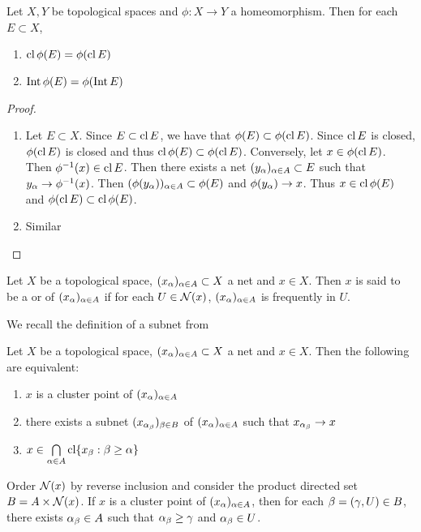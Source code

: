 \documentclass{book}
\begin{document}
	\begin{ex} 
		Let $X, Y$ be topological spaces and $\phi: X \rightarrow Y$ a homeomorphism. Then for each $E \subset X$, 
		\begin{enumerate}
			\item $\operatorname{cl} \phi(E) = \phi(\operatorname{cl} E)$  
			\item $\operatorname{Int} \phi(E) = \phi( \operatorname{Int} E)$  
		\end{enumerate} 
	\end{ex}
	
	\begin{proof}\
		\begin{enumerate}
			\item Let $E \subset X$. Since $E \subset \operatorname{cl} E$, we have that $\phi(E) \subset \phi(\operatorname{cl} E)$. Since $\operatorname{cl} E$ is closed, $\phi(\operatorname{cl} E)$ is closed and thus $\operatorname{cl} \phi(E) \subset \phi(\operatorname{cl} E)$. Conversely, let $x \in \phi(\operatorname{cl} E)$. Then $\phi^{-1}(x) \in \operatorname{cl} E$. Then there exists a net $( y_{\alpha} )_{\alpha \in A} \subset E$ such that $y_{\alpha} \rightarrow \phi^{-1}(x)$. Then $( \phi(y_{\alpha}) )_{\alpha \in A } \subset \phi(E)$ and $\phi(y_{\alpha}) \rightarrow x$. Thus $x \in \operatorname{cl} \phi(E)$ and $\phi(\operatorname{cl} E) \subset \operatorname{cl} \phi(E)$.
			\item Similar
		\end{enumerate} 
	\end{proof}

	\begin{defn} 
		Let $X$ be a topological space, $(x_{\alpha})_{\alpha \in A} \subset X$ a net and $x \in X$. Then $x$ is said to be a  or  of $(x_{\alpha})_{\alpha \in A}$ if for each $U \in \mathcal{N}(x)$, $(x_{\alpha})_{\alpha \in A}$ is frequently in $U$.
	\end{defn}

	\begin{note}
		We recall the definition of a subnet from 
	\end{note}
	
	\begin{ex} 
	Let $X$ be a topological space, $(x_{\alpha})_{\alpha \in A} \subset X$ a net and $x \in X$. Then the following are equivalent: 
	\begin{enumerate}
		\item $x$ is a cluster point of $(x_{\alpha})_{\alpha \in A}$
		\item there exists a subnet $(x_{\alpha_{\beta}})_{\beta \in B}$ of $(x_{\alpha})_{\alpha \in A}$ such that $x_{\alpha_{\beta}} \rightarrow x$
		\item $x \in \bigcap\limits_{\alpha \in A} \operatorname{cl} \{x_{\beta}: \beta \geq \alpha\}$
	\end{enumerate}
	 Order $\mathcal{N}(x)$ by reverse inclusion and consider the product directed set $B = A \times \mathcal{N}(x)$. If $x$ is a cluster point of $(x_{\alpha})_{\alpha \in A}$, then for each $\beta = (\gamma, U) \in B$, there exists $\alpha_{\beta} \in A$ such that $\alpha_{\beta} \geq \gamma$ and $\alpha_{\beta} \in U$. 
	\end{ex}
\end{document}
